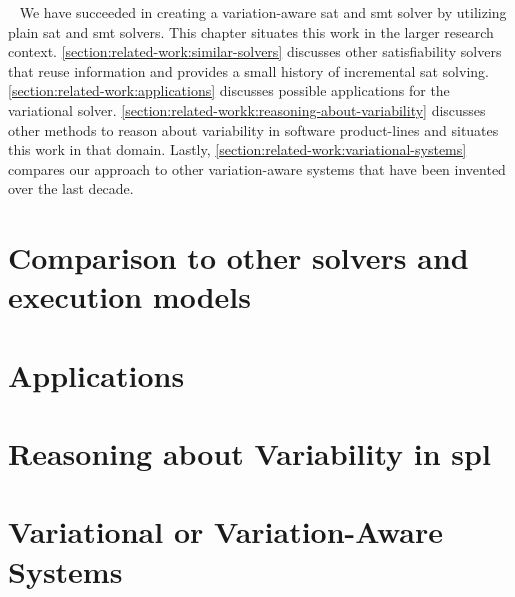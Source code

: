 ~\label{chapter:related-work}
%
We have succeeded in creating a variation-aware \ac{sat} and \ac{smt} solver by
utilizing plain \ac{sat} and \ac{smt} solvers. This chapter situates this work
in the larger research context. \autoref{section:related-work:similar-solvers}
discusses other satisfiability solvers that reuse information and provides a
small history of incremental \ac{sat} solving.
\autoref{section:related-work:applications} discusses possible applications for
the variational solver.
\autoref{section:related-workk:reasoning-about-variability} discusses other
methods to reason about variability in software product-lines and situates this
work in that domain. Lastly, \autoref{section:related-work:variational-systems}
compares our approach to other variation-aware systems that have been invented
over the last decade.
%
\section{Comparison to other solvers and execution models}

%
\section{Applications}

%
\section{Reasoning about Variability in \ac{spl}}

%
\section{Variational or Variation-Aware Systems}



